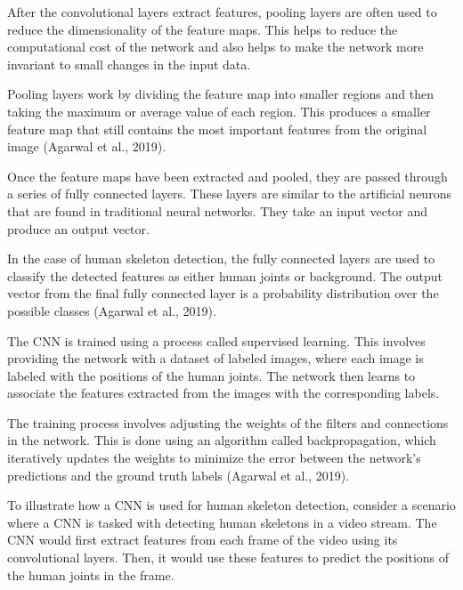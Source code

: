 
After the convolutional layers extract features, pooling layers are often used to reduce the dimensionality of the feature maps. This helps to reduce the computational cost of the network and also helps to make the network more invariant to small changes in the input data.

Pooling layers work by dividing the feature map into smaller regions and then taking the maximum or average value of each region. This produces a smaller feature map that still contains the most important features from the original image (\scc Agarwal et al., 2019).


Once the feature maps have been extracted and pooled, they are passed through a series of fully connected layers. These layers are similar to the artificial neurons that are found in traditional neural networks. They take an input vector and produce an output vector.

In the case of human skeleton detection, the fully connected layers are used to classify the detected features as either human joints or background. The output vector from the final fully connected layer is a probability distribution over the possible classes (\scc Agarwal et al., 2019).


The CNN is trained using a process called supervised learning. This involves providing the network with a dataset of labeled images, where each image is labeled with the positions of the human joints. The network then learns to associate the features extracted from the images with the corresponding labels.

The training process involves adjusting the weights of the filters and connections in the network. This is done using an algorithm called backpropagation, which iteratively updates the weights to minimize the error between the network's predictions and the ground truth labels (\scc Agarwal et al., 2019).


To illustrate how a CNN is used for human skeleton detection, consider a scenario where a CNN is tasked with detecting human skeletons in a video stream. The CNN would first extract features from each frame of the video using its convolutional layers. Then, it would use these features to predict the positions of the human joints in the frame.

